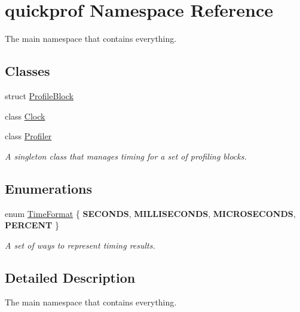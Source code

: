 \hypertarget{namespacequickprof}{
\section{quickprof Namespace Reference}
\label{namespacequickprof}
}


The main namespace that contains everything.  
\subsection*{Classes}
\begin{DoxyCompactItemize}
\item 
struct \hyperlink{structquickprof_1_1_profile_block}{ProfileBlock}
\item 
class \hyperlink{classquickprof_1_1_clock}{Clock}
\item 
class \hyperlink{classquickprof_1_1_profiler}{Profiler}
\begin{DoxyCompactList}\small\item\em A singleton class that manages timing for a set of profiling blocks. \item\end{DoxyCompactList}\end{DoxyCompactItemize}
\subsection*{Enumerations}
\begin{DoxyCompactItemize}
\item 
enum \hyperlink{namespacequickprof_a9bd89a54bb92c3d77f445ca65cb4684f}{TimeFormat} \{ {\bfseries SECONDS}, 
{\bfseries MILLISECONDS}, 
{\bfseries MICROSECONDS}, 
{\bfseries PERCENT}
 \}
\begin{DoxyCompactList}\small\item\em A set of ways to represent timing results. \item\end{DoxyCompactList}\end{DoxyCompactItemize}


\subsection{Detailed Description}
The main namespace that contains everything. 